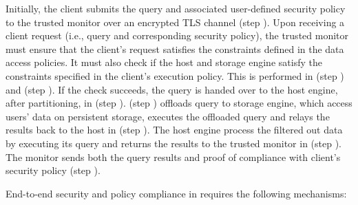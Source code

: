 Initially, the client submits the query and associated user-defined security policy to the trusted monitor over an encrypted TLS channel (step ). 
Upon receiving a client request (i.e., query and corresponding security policy), the trusted monitor must ensure that the client's request satisfies the constraints defined in the data access policies. It must also check if the host and storage engine satisfy the constraints specified in the client's execution policy. This is performed in (step ) and (step ). If the check succeeds, the query is handed over to the host engine, after partitioning, in (step ). (step ) offloads query to storage engine, which access users' data on persistent storage, executes the offloaded query and relays the results back to the host in (step ). The host engine process the filtered out data by executing its query and returns the results to the trusted monitor in (step ). The monitor sends both the query results and proof of compliance with client's security policy (step ).





End-to-end security and policy compliance in \project{} requires the following mechanisms:

